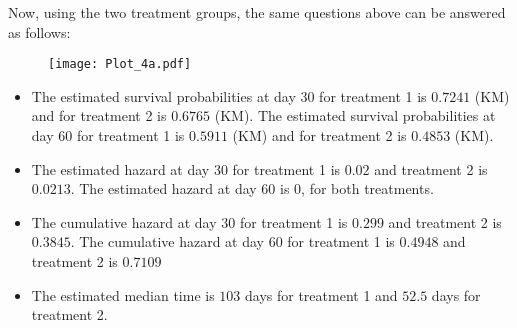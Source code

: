 \documentclass[11pt]{extarticle} %
\begin{document}
Now, using the two treatment groups, the same questions above can be answered as follows:
\begin{center}
\begin{figure}[H]
\texttt{[image: Plot\_4a.pdf]}
\end{figure}
\end{center}

\begin{itemize}
\item 
The estimated survival probabilities at day 30 for treatment 1 is $0.7241$ (KM) and for treatment 2 is $0.6765$ (KM). The estimated survival probabilities at day 60 for treatment 1 is $0.5911$ (KM) and for treatment 2 is $0.4853$ (KM).
\item
The estimated hazard at day 30 for treatment 1 is $0.02$ and treatment 2 is $0.0213$. The estimated hazard at day 60 is $0$, for both treatments.
\item
The cumulative hazard at day 30 for treatment 1 is $0.299$ and treatment 2 is $0.3845$. The cumulative hazard at day 60 for treatment 1 is $0.4948$ and treatment 2 is $0.7109$
\item
The estimated median time is $103$ days for treatment 1 and $52.5$ days for treatment 2.
\end{itemize}


\end{document}
